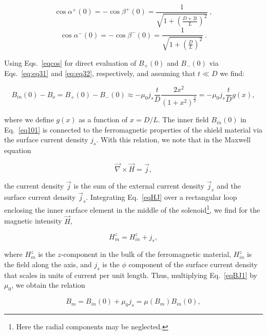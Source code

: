 \documentclass[12pt]{article}
\begin{document}
\begin{equation}
\cos\alpha^+(0)=-\cos\beta^+(0)=\frac{1}{\sqrt{1+\left(\frac{D+2t}{L}\right)^2}}~, \nonumber
\label{eqcos1}
\end{equation}
\begin{equation}
\cos\alpha^-(0)=-\cos\beta^-(0)=\frac{1}{\sqrt{1+\left(\frac{D}{L}\right)^2}}~.
\label{eqcos}
\end{equation}

\noindent
Using Eqs.~\ref{eqcos} for direct evaluation of $B_+(0)$ and $B_-(0)$ via 
Eqs.~\ref{eq:eq31} and \ref{eq:eq32}, respectively, and assuming that $t \ll D$ 
we find:

\begin{equation}
B_{in}(0) - B_o = B_+(0) - B_-(0) \approx - \mu_0 j_s  \frac{t}{D} \frac{2x^2} 
{(1+x^2)^{\frac{3}{2}}} = -\mu_0 j_s \frac{t}{D} g(x),
\label{eq101}
\end{equation}

\noindent
where we define $g(x)$ as a function of $x=D/L$. The inner field $B_{in}(0)$ in 
Eq.~\ref{eq101} is connected to the ferromagnetic properties of the shield 
material via the surface current density $j_s$. With this relation, we note that 
in the Maxwell equation

\begin{equation}
\vec{\nabla} \times \vec{H} = \vec{j},
\label{eqHJ}
\end{equation}

\noindent
the current density $\vec{j}$ is the sum of the external current density
$\vec{j}_e$ and the surface current density $\vec{j}_s$. Integrating 
Eq.~\ref{eqHJ} over a rectangular loop enclosing the inner surface element in 
the middle of the solenoid\footnote{Here the radial components may be neglected.}, 
we find for the magnetic intensity $\vec{H}$,

\begin{equation}
H_m^z =H_{in}^z+j_s,
\label{eqBJ1}
\end{equation}

\noindent
where $H_m^z$ is the $z$-component in the bulk of the ferromagnetic material, 
$H_{in}^z$ is the field along the axis, and $j_s$ is the $\phi$ component of 
the surface current density that scales in units of current per unit length. 
Thus, multiplying Eq.~\ref{eqBJ1} by $\mu_0$, we obtain the relation

\begin{equation}
B_m = B_{in}(0) + \mu_0 j_s = \mu(B_m)B_{in}(0),  
\label{eqBJ}
\end{equation}
\end{document}
